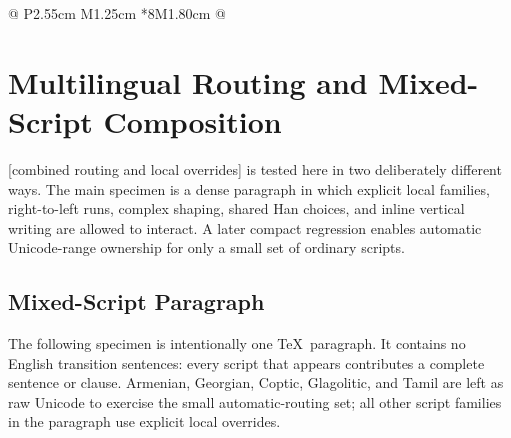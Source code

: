 {\begin{landscape}
\begin{TableLong}{
  @{}
  P{2.55cm}
  M{1.25cm}
  *{8}{M{1.80cm}}
  @{}
}


\bottomrule
\end{TableLong}

\end{landscape}
}


\section{Multilingual Routing and Mixed-Script Composition}

[combined routing and local overrides] is tested here in two deliberately
different ways. The main specimen is a dense paragraph in which explicit local
families, right-to-left runs, complex shaping, shared Han choices, and inline
vertical writing are allowed to interact. A later compact regression enables
automatic Unicode-range ownership for only a small set of ordinary scripts.

\subsection{Mixed-Script Paragraph}

The following specimen is intentionally one \TeX~paragraph. It contains no
English transition sentences: every script that appears contributes a complete
sentence or clause. Armenian, Georgian, Coptic, Glagolitic, and Tamil are
left as raw Unicode to exercise the small automatic-routing set; all other
script families in the paragraph use explicit local overrides.


